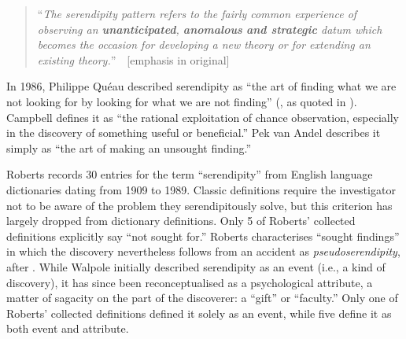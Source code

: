 \begin{quote}
``\emph{The serendipity pattern refers to the fairly common experience of observing an \emph{\textbf{unanticipated}}, \emph{\textbf{anomalous}} \emph{\textbf{and strategic}} datum which becomes the occasion for developing a new theory or for extending an existing theory.}''~\cite[p. 506]{merton1948bearing}~{[}emphasis in original{]}
\end{quote}

In 1986, Philippe Qu\'eau described serendipity as ``the art of
finding what we are not looking for by looking for what we are not
finding'' (, as quoted in
\cite[p. 121]{Campos2002}).  Campbell
\citeyear{campbell2005serendipity} defines it as ``the rational
exploitation of chance observation, especially in the discovery of
something useful or beneficial.''  Pek van Andel
\citeyear[p. 631]{van1994anatomy} describes it simply as ``the art of
making an unsought finding.''


Roberts \citeyear[pp. 246--249]{roberts} records 30 entries for the term ``serendipity'' from English language dictionaries dating from 1909 to 1989.  
%
Classic definitions require the investigator not to be aware of the problem they serendipitously solve, but this criterion has largely dropped from dictionary definitions. Only 5 of Roberts' collected definitions explicitly say ``not sought for.''  Roberts characterises ``sought findings'' in which the discovery nevertheless follows from an accident as \emph{pseudoserendipity}, after .
%
While Walpole initially described serendipity as an event (i.e., a
kind of discovery), it has since been reconceptualised as a
psychological attribute, a matter of sagacity on the part of the
discoverer: a ``gift'' or ``faculty.''  Only one of Roberts' collected
definitions defined it solely as an event, while five define it as
both event and attribute.

